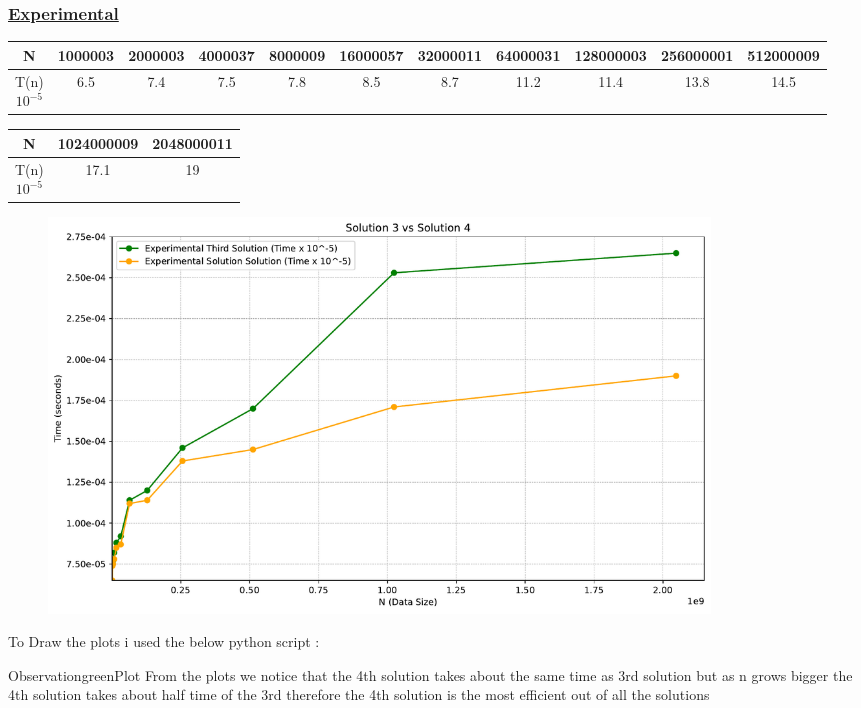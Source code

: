 

\subsubsection*{\underline{Experimental}}

\begin{tabular}{|c|c|c|c|c|c|c|c|c|c|c|}
\hline
N & 1000003 & 2000003 & 4000037 & 8000009 & 16000057 & 32000011 & 64000031 & 128000003 & 256000001 & 512000009 \\
\hline
\makecell{T(n)\\\(10^{-5}\)} & 6.5 & 7.4 & 7.5 & 7.8 & 8.5 & 8.7 & 11.2 & 11.4 & 13.8 & 14.5\\
\hline
\end{tabular}

\vspace{0.25cm}

\begin{tabular}{|c|c|c|}
    \hline
    N & 1024000009 & 2048000011\\
    \hline
    \makecell{T(n)\\\(10^{-5}\)}  & 17.1 & 19\\
    \hline
\end{tabular}



\vspace{0.5cm}

\begin{figure}[h!]
    \centering
    \includegraphics[width=0.85\textwidth]{Questions/Part4/plot.pdf}
    \label{fig:time_plot}
\end{figure}

\newpage

To Draw the plots i used the below python script :

\vspace{1cm}



\vspace{1cm}

\begin{prettyBox}{Observation}{greenPlot}
From the plots we notice that the 4th solution takes about the same time as 3rd solution but as n grows bigger the 4th solution takes about
half time of the 3rd therefore the 4th solution is the most efficient out of all the solutions
\end{prettyBox}


